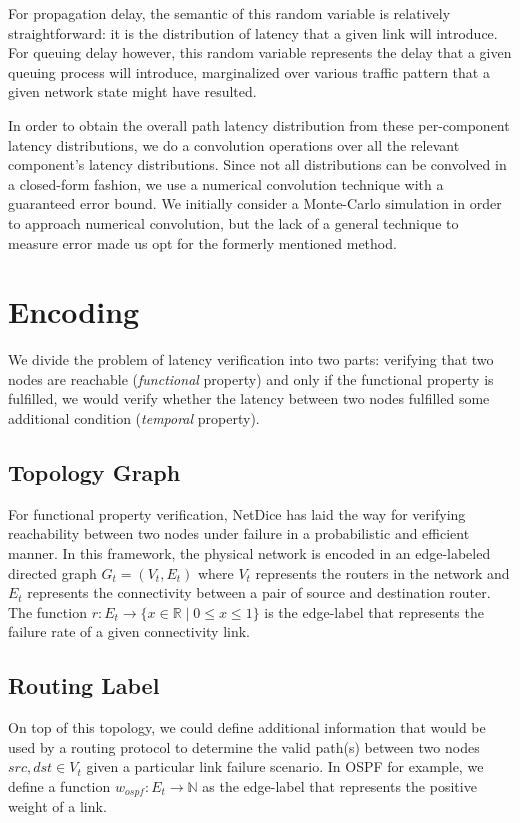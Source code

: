 \documentclass[10pt,sigconf,letterpaper,anonymous,nonacm]{acmart}
\begin{document}
For propagation delay, the semantic of this random variable is relatively straightforward: it is 
the distribution of latency that a given link will introduce.
For queuing delay however, this random variable represents the delay that a given queuing process 
will introduce, marginalized over various traffic pattern that a given network state might have 
resulted.

In order to obtain the overall path latency distribution from these per-component latency 
distributions, we do a convolution operations over all the relevant component's latency 
distributions.
Since not all distributions can be convolved in a closed-form fashion, we use a numerical 
convolution technique with a guaranteed error bound. 
We initially consider a Monte-Carlo simulation in order to approach numerical convolution, but 
the lack of a general technique to measure error made us opt for the formerly mentioned method.


\section{Encoding}
We divide the problem of latency verification into two parts: 
verifying that two nodes are reachable (\textit{functional} property) and only if 
the functional property is fulfilled, we would verify whether the latency between 
two nodes fulfilled some additional condition (\textit{temporal} property).

\subsection{Topology Graph}
For functional property verification, NetDice \cite{steffen2020probabilistic} 
has laid the way for verifying reachability between two nodes under failure in a 
probabilistic and efficient manner. 
In this framework, the physical network is encoded in an edge-labeled directed graph 
$G_t = (V_t, E_t)$ where $V_t$ represents the routers in the network and 
$E_t$ represents the connectivity between a pair of source and destination router. 
The function $r: E_t \rightarrow \{x \in \mathbb{R} \mid 0 \le x \le 1\}$ is the 
edge-label that represents the failure rate of a given connectivity link.

\subsection{Routing Label}
On top of this topology, we could define additional information that would be used
by a routing protocol to determine the valid path(s) between two nodes 
$src, dst \in V_t$ given a particular link failure scenario. 
In OSPF for example, we define a function $w_{ospf}: E_t \rightarrow \mathbb{N}$ as the edge-label 
that represents the positive weight of a link.
\end{document}
